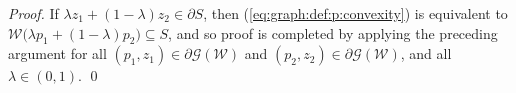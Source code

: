 \documentclass[smallextended]{svjour3}       %
\numberwithin{equation}{section}
\begin{document}
\begin{proof}
  If $\lambda z_1 + (1-\lambda ) z_2 \in\partial S$, then (\ref{eq:graph:def:p:convexity}) is equivalent to $\mathcal W\bigl(\lambda p_1 + (1-\lambda) p_2 \bigr) \subseteq S$, and so proof is completed by applying the preceding argument for all $(p_1,z_1) \in\partial\mathscr G(\mathcal W)$ and $(p_2,z_2)\in\partial\mathscr G(\mathcal W)$, and all $\lambda\in (0,1)$.
  \qed

\end{proof}
%
\end{document}
